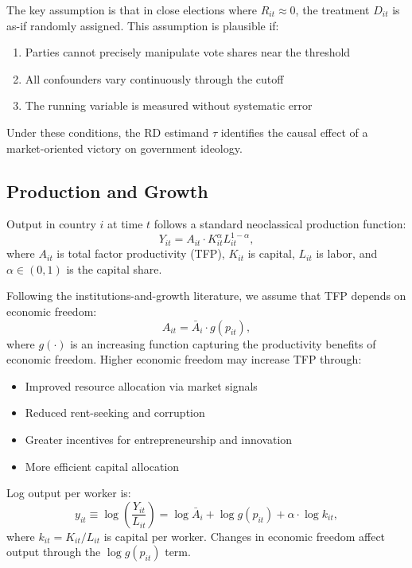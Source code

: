 \documentclass[12pt,a4paper]{article}
\begin{document}
The key assumption is that in close elections where $R_{it} \approx 0$, 
the treatment $D_{it}$ is as-if randomly assigned. This assumption is 
plausible if:
\begin{enumerate}[noitemsep]
    \item Parties cannot precisely manipulate vote shares near the threshold
    \item All confounders vary continuously through the cutoff
    \item The running variable is measured without systematic error
\end{enumerate}

Under these conditions, the RD estimand $\tau$ identifies the causal effect 
of a market-oriented victory on government ideology.

\subsection{Production and Growth}

Output in country $i$ at time $t$ follows a standard neoclassical production 
function:
%
\begin{equation}
    Y_{it} = A_{it} \cdot K_{it}^{\alpha} L_{it}^{1 - \alpha},
\end{equation}
%
where $A_{it}$ is total factor productivity (TFP), $K_{it}$ is capital, 
$L_{it}$ is labor, and $\alpha \in (0, 1)$ is the capital share.

Following the institutions-and-growth literature, we assume that TFP 
depends on economic freedom:
%
\begin{equation}
    A_{it} = \bar{A}_i \cdot g(p_{it}),
\end{equation}
%
where $g(\cdot)$ is an increasing function capturing the productivity 
benefits of economic freedom. Higher economic freedom may increase TFP 
through:
\begin{itemize}[noitemsep]
    \item Improved resource allocation via market signals
    \item Reduced rent-seeking and corruption
    \item Greater incentives for entrepreneurship and innovation
    \item More efficient capital allocation
\end{itemize}

Log output per worker is:
%
\begin{equation}
    y_{it} \equiv \log \left( \frac{Y_{it}}{L_{it}} \right) = 
    \log \bar{A}_i + \log g(p_{it}) + \alpha \cdot \log k_{it},
\end{equation}
%
where $k_{it} = K_{it}/L_{it}$ is capital per worker. Changes in economic 
freedom affect output through the $\log g(p_{it})$ term.
\end{document}
